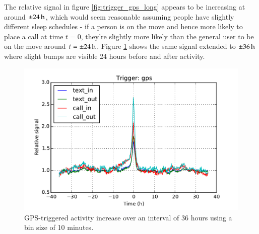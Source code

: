 The relative signal in figure \ref{fig:trigger_gps_long} appears to be increasing at around $\pm \unit[24]{h}$, which would seem reasonable assuming people have slightly different  sleep schedules - if a person is on the move and hence more likely to place a call at time $t=0$, they're slightly more likely than the general user to be on the move around $t = \unit[\pm 24]{h}$. Figure \ref{fig:gps_longest} shows the same signal extended to $\unit[\pm 36]{h}$ where slight bumps are visible 24 hours before and after activity.
\begin{figure} %
	\centering
	\includegraphics[width=\figwidth]{pics/dtu/gps-int129600-bin600.pdf}
	\caption{GPS-triggered activity increase over an interval of 36 hours using a bin size of 10 minutes.}
	\label{fig:gps_longest}
\end{figure}

\FloatBarrier
